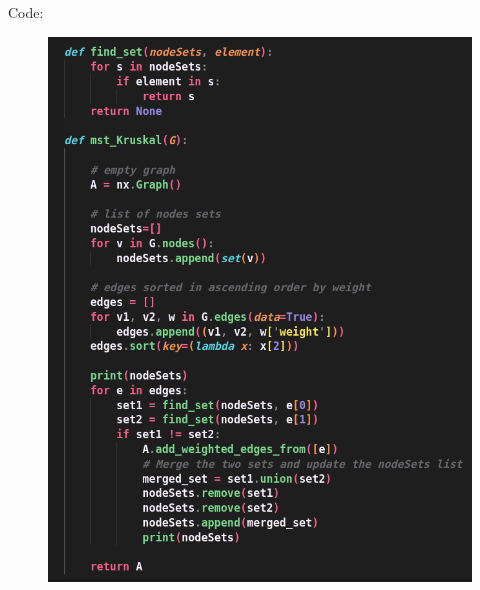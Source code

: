 \documentclass{article}
\begin{document}
    \begin{center}
        \begin{minipage}[t]{0.9\textwidth}
            Code:
            \begin{figure}[H]
                \centering
                \includegraphics[width=1\textwidth, height=0.2\textheight]{"./part1_code.png"}
            \end{figure}
        \end{minipage}
    \end{center}
\end{document}
